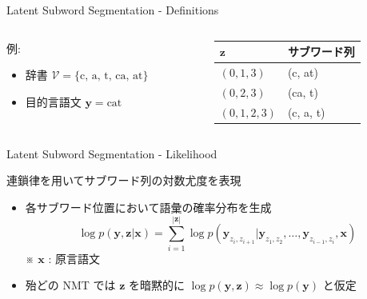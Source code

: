 \documentclass[unicode, 12pt, xdvipdfmx, aspectratio=43]{beamer}
\begin{document}
\begin{frame}[label={sec:orgf4662e8}]{Latent Subword Segmentation - Definitions}
\begin{columns}
\begin{column}{0.5\columnwidth}
\begin{block}{例:}
\footnotesize
\begin{itemize}
\item 辞書 \(\mathcal{V} = \{\text{c, a, t, ca, at}\}\)
\item 目的言語文 \(\boldsymbol{y} = \text{cat}\)
\end{itemize}
\end{block}
\end{column}

\begin{column}{0.5\columnwidth}
\footnotesize

\begin{center}
\begin{tabular}{ll}
\toprule
\(\boldsymbol{z}\) & サブワード列\\
\midrule
\((0,1,3)\) & (c, at)\\
\((0,2,3)\) & (ca, t)\\
\((0,1,2,3)\) & (c, a, t)\\
\bottomrule
\end{tabular}
\end{center}
\end{column}
\end{columns}
\end{frame}

\begin{frame}[label={sec:org164a588}]{Latent Subword Segmentation - Likelihood}
\begin{block}{連鎖律を用いてサブワード列の対数尤度を表現}
\begin{itemize}
\item 各サブワード位置において語彙の確率分布を生成
\begin{equation*}
  \log p(\boldsymbol{y},\boldsymbol{z} | \boldsymbol{x}) = \sum_{i=1}^{|\boldsymbol{z}|} \log p(\boldsymbol{y}_{z_i, z_{i+1}} | \boldsymbol{y}_{z_1, z_2},\ldots,\boldsymbol{y}_{z_{i-1}, z_i}, \boldsymbol{x})
\end{equation*}
※ \(\boldsymbol{x}\) : 原言語文
\item 殆どの NMT では \(\boldsymbol{z}\) を暗黙的に \(\log p(\boldsymbol{y}, \boldsymbol{z}) \approx \log p(\boldsymbol{y})\) と仮定
\end{itemize}
\end{block}
\end{frame}
\end{document}
